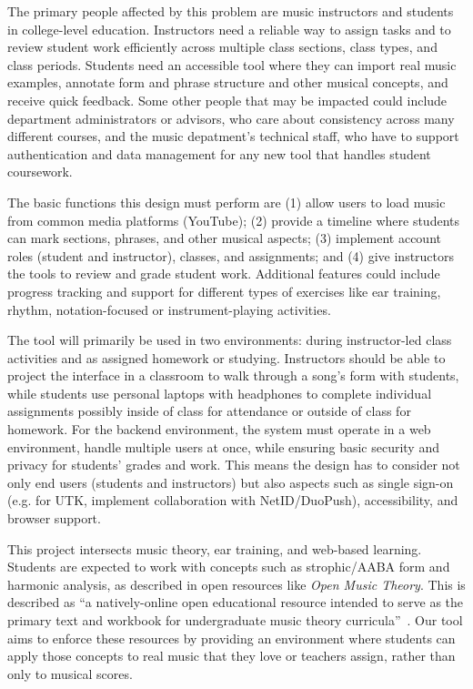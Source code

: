 \documentclass[12pt, letterpaper]{article}
\begin{document}
The primary people affected by this problem are music instructors and students in college-level education. Instructors need a reliable way to assign tasks and to review student work efficiently across multiple class sections, class types, and class periods. Students need an accessible tool where they can import real music examples, annotate form and phrase structure and other musical concepts, and receive quick feedback. Some other people that may be impacted could include department administrators or advisors, who care about consistency across many different courses, and the music depatment's technical staff, who have to support authentication and data management for any new tool that handles student coursework.

The basic functions this design must perform are (1) allow users to load music from common media platforms (YouTube); (2) provide a timeline where students can mark sections, phrases, and other musical aspects; (3) implement account roles (student and instructor), classes, and assignments; and (4) give instructors the tools to review and grade student work. Additional features could include progress tracking and support for different types of exercises like ear training, rhythm, notation-focused or instrument-playing activities.

The tool will primarily be used in two environments: during instructor-led class activities and as assigned homework or studying. Instructors should be able to project the interface in a classroom to walk through a song's form with students, while students use personal laptops with headphones to complete individual assignments possibly inside of class for attendance or outside of class for homework. For the backend environment, the system must operate in a web environment, handle multiple users at once, while ensuring basic security and privacy for students' grades and work. This means the design has to consider not only end users (students and instructors) but also aspects such as single sign-on (e.g. for UTK, implement collaboration with NetID/DuoPush), accessibility, and browser support.

This project intersects music theory, ear training, and web-based learning. Students are expected to work with concepts such as strophic/AABA form and harmonic analysis, as described in open resources like \emph{Open Music Theory}. This is described as ``a natively-online open educational resource intended to serve as the primary text and workbook for undergraduate music theory curricula''~\cite{omt}. Our tool aims to enforce these resources by providing an environment where students can apply those concepts to real music that they love or teachers assign, rather than only to musical scores.
\end{document}
